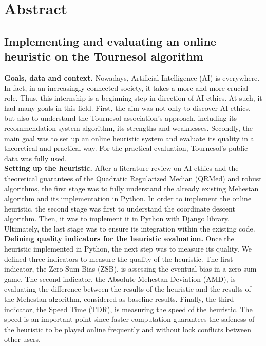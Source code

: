 \section*{Abstract}
\subsection*{Implementing and evaluating an online heuristic on the Tournesol algorithm}

\textbf{Goals, data and context.} Nowadays, Artificial Intelligence (AI) is everywhere. In fact, in an increasingly connected society, it takes a more and more crucial role. Thus, this internship is a beginning step in direction of AI ethics. At such, it had many goals in this field. First, the aim was not only to
discover AI ethics, but also to understand the Tournesol association's approach, including
its recommendation system algorithm, its strengths and weaknesses. Secondly, the main goal was to set up an
online heuristic system and evaluate its quality in a theoretical and practical way. For the practical evaluation, Tournesol's public data was fully used.\\
\textbf{Setting up the heuristic.} After a literature review on AI ethics and the theoretical guarantees of the Quadratic Regularized Median (QRMed) and 
robust algorithms, the first stage was to fully understand the already existing Mehestan algorithm and its
implementation in Python. In order to implement the online heuristic, the second stage was first to understand the
coordinate descent algorithm. Then, it was to implement it in Python with Django library. Ultimately, the last stage was to ensure its integration within the existing code.\\
\textbf{Defining quality indicators for the heuristic evaluation.} Once the heuristic implemented in Python, the next step was to measure its quality. We defined three indicators to measure the quality of the heuristic. The first indicator, the Zero-Sum Bias (ZSB), is assessing the eventual bias in a zero-sum game. The second indicator, the Absolute Mehestan Deviation (AMD), is evaluating
the difference between the results of the heuristic and the results of the Mehestan algorithm, considered as baseline results. Finally, the third indicator, the Speed Time (TDR), is measuring the speed of the heuristic. The speed is an important point since faster computation guarantees the safeness of the heuristic to be played online frequently and without lock conflicts between other users.\\
